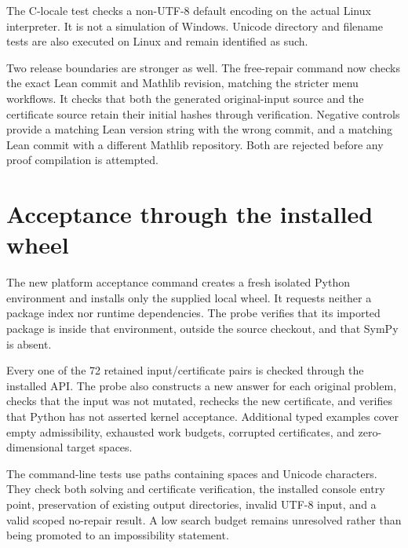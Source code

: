 \begin{scopebox}[title=The regression is specific]
The C-locale test checks a non-UTF-8 default encoding on the actual Linux interpreter. It is not a simulation of Windows. Unicode directory and filename tests are also executed on Linux and remain identified as such.
\end{scopebox}

Two release boundaries are stronger as well. The free-repair command now checks the exact Lean commit and Mathlib revision, matching the stricter menu workflows. It checks that both the generated original-input source and the certificate source retain their initial hashes through verification. Negative controls provide a matching Lean version string with the wrong commit, and a matching Lean commit with a different Mathlib repository. Both are rejected before any proof compilation is attempted.

\section{Acceptance through the installed wheel}

The new platform acceptance command creates a fresh isolated Python environment and installs only the supplied local wheel. It requests neither a package index nor runtime dependencies. The probe verifies that its imported package is inside that environment, outside the source checkout, and that SymPy is absent.

Every one of the 72 retained input/certificate pairs is checked through the installed API. The probe also constructs a new answer for each original problem, checks that the input was not mutated, rechecks the new certificate, and verifies that Python has not asserted kernel acceptance. Additional typed examples cover empty admissibility, exhausted work budgets, corrupted certificates, and zero-dimensional target spaces.

The command-line tests use paths containing spaces and Unicode characters. They check both solving and certificate verification, the installed console entry point, preservation of existing output directories, invalid UTF-8 input, and a valid scoped no-repair result. A low search budget remains unresolved rather than being promoted to an impossibility statement.

